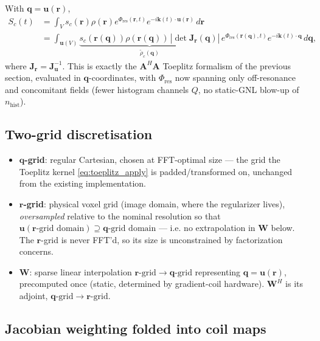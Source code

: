 \documentclass{article}
\begin{document}
With $\mathbf{q}=\mathbf{u}(\mathbf{r})$,
\begin{align}
    S_c(t) &= \int_V s_c(\mathbf{r})\rho(\mathbf{r}) e^{\Phi_{\mathrm{res}}(\mathbf{r},t)}
              e^{-i\mathbf{k}(t)\cdot\mathbf{u}(\mathbf{r})}\, d\mathbf{r} \nonumber\\
           &= \int_{\mathbf{u}(V)} \underbrace{s_c(\mathbf{r}(\mathbf{q}))\rho(\mathbf{r}(\mathbf{q}))
              \,|\det \mathbf{J}_{\mathbf{r}}(\mathbf{q})|}_{\tilde\rho_c(\mathbf{q})}
              \, e^{\Phi_{\mathrm{res}}(\mathbf{r}(\mathbf{q}),t)} e^{-i\mathbf{k}(t)\cdot\mathbf{q}}
              \, d\mathbf{q},
\end{align}
where $\mathbf{J}_{\mathbf{r}} = \mathbf{J}_{\mathbf{u}}^{-1}$. This is exactly the
$\mathbf{A}^H\mathbf{A}$ Toeplitz formalism of the previous section, evaluated in
$\mathbf{q}$-coordinates, with $\Phi_{\mathrm{res}}$ now spanning only off-resonance and
concomitant fields (fewer histogram channels $Q$, no static-GNL blow-up of $n_{\mathrm{hist}}$).

\subsection{Two-grid discretisation}

\begin{itemize}
    \item \textbf{$\mathbf{q}$-grid}: regular Cartesian, chosen at FFT-optimal size — the
          grid the Toeplitz kernel \eqref{eq:toeplitz_apply} is padded/transformed on,
          unchanged from the existing implementation.
    \item \textbf{$\mathbf{r}$-grid}: physical voxel grid (image domain, where the
          regularizer lives), \emph{oversampled} relative to the nominal resolution so that
          $\mathbf{u}(\text{$\mathbf{r}$-grid domain}) \supseteq \text{$\mathbf{q}$-grid
          domain}$ — i.e. no extrapolation in $\mathbf{W}$ below. The $\mathbf{r}$-grid is
          never FFT'd, so its size is unconstrained by factorization concerns.
    \item $\mathbf{W}$: sparse linear interpolation $\mathbf{r}\text{-grid}
          \to \mathbf{q}\text{-grid}$ representing $\mathbf{q}=\mathbf{u}(\mathbf{r})$,
          precomputed once (static, determined by gradient-coil hardware). $\mathbf{W}^H$ is
          its adjoint, $\mathbf{q}\text{-grid}\to\mathbf{r}\text{-grid}$.
\end{itemize}

\subsection{Jacobian weighting folded into coil maps}
\end{document}

